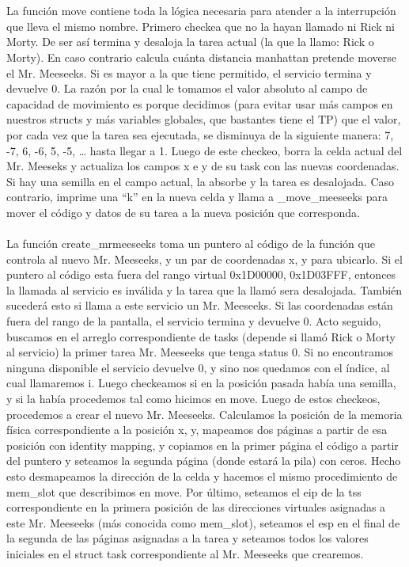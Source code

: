 \\\\
La función move contiene toda la lógica necesaria para atender a la interrupción que lleva el mismo nombre. Primero checkea que no la hayan llamado ni Rick ni Morty. De ser así termina y desaloja la tarea actual (la que la llamo: Rick o Morty). En caso contrario calcula cuánta distancia manhattan pretende moverse el Mr. Meeseeks. Si es mayor a la que tiene permitido, el servicio termina y devuelve 0. La razón por la cual le tomamos el valor absoluto al campo de capacidad de movimiento es porque decidimos (para evitar usar más campos en nuestros structs y más variables globales, que bastantes tiene el TP) que el valor, por cada vez que la tarea sea ejecutada, se disminuya de la siguiente manera: 7, -7, 6, -6, 5, -5, … hasta llegar a 1. Luego de este checkeo, borra la celda actual del Mr. Meeseks y actualiza los campos x e y de su task con las nuevas coordenadas. Si hay una semilla en el campo actual, la absorbe y la tarea es desalojada. Caso contrario, imprime una “k” en la nueva celda y llama a _move_meeseeks para mover el código y datos de su tarea a la nueva posición que corresponda.
\\\\
La función create_mrmeeseeks toma un puntero al código de la función que controla al nuevo Mr. Meeseeks, y un par de coordenadas x, y para ubicarlo. Si el puntero al código esta fuera del rango virtual 0x1D00000, 0x1D03FFF, entonces la llamada al servicio es inválida y la tarea que la llamó sera desalojada. También sucederá esto si llama a este servicio un Mr. Meeseeks. Si las coordenadas están fuera del rango de la pantalla, el servicio termina y devuelve 0. Acto seguido, buscamos en el arreglo correspondiente de tasks (depende si llamó Rick o Morty al servicio) la primer tarea Mr. Meeseeks que tenga status 0. Si no encontramos ninguna disponible el servicio devuelve 0, y sino nos quedamos con el índice, al cual llamaremos i. Luego checkeamos si en la posición pasada había una semilla, y si la había procedemos tal como hicimos en move. Luego de estos checkeos, procedemos a crear el nuevo Mr. Meeseeks. Calculamos la posición de la memoria física correspondiente a la posición x, y, mapeamos dos páginas a partir de esa posición con identity mapping, y copiamos en la primer página el código a partir del puntero y seteamos la segunda página (donde estará la pila) con ceros. Hecho esto desmapeamos la dirección de la celda y hacemos el mismo procedimiento de mem_slot que describimos en move. Por último, seteamos el eip de la tss correspondiente en la primera posición de las direcciones virtuales asignadas a este Mr. Meeseeks (más conocida como mem_slot), seteamos el esp en el final de la segunda de las páginas asignadas a la tarea y seteamos todos los valores iniciales en el struct task correspondiente al Mr. Meeseeks que crearemos.
